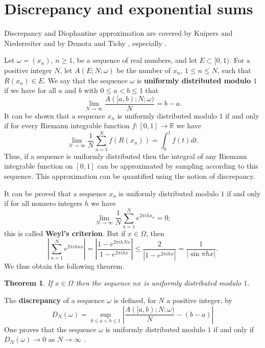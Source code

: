 \documentclass{article}
\newtheorem{theorem}{Theorem}
\begin{document}
\section{Discrepancy and exponential sums}
\label{discrepancy}
Discrepancy and Diophantine approximation are covered by Kuipers and Niederreiter \cite[Chapters 1--2 ]{kuipers} and by 
Drmota and Tichy \cite[\S\S 1.1--1.4]{drmota}, especially \cite[pp.~48--66, \S 1.4.1]{drmota}.

Let $\omega=(x_n)$, $n \geq 1$, be a sequence of real numbers, and let $E \subset [0,1)$. For a positive integer $N$, let
$A(E;N;\omega)$ be the number of $x_n$, $1 \leq n \leq N$, such that $R(x_n) \in E$. 
We say that the sequence $\omega$ is \textbf{uniformly distributed modulo $1$} if we have for all $a$ and $b$ with $0 \leq a < b \leq 1$ that 
\[
\lim_{N \to \infty} \frac{A([a,b);N;\omega)}{N}=b-a.
\]
It can be shown \cite[p. 3, Corollary 1.1]{kuipers} that a sequence $x_n$ is uniformly distributed modulo $1$ if and only if for every 
Riemann integrable function $f:[0,1] \to \mathbb{R}$ we have 
\begin{equation}
\lim_{N \to \infty} \frac{1}{N} \sum_{n=1}^N f(R(x_n))= \int_0^1 f(t) dt.
\label{riemann}
\end{equation}
Thus, if a sequence is uniformly distributed then the integral of any Riemann integrable function on $[0,1]$ can be approximated by sampling according to this sequence.
This approximation can be quantified using the notion of discrepancy.

It can be proved \cite[p.~7, Theorem 2.1]{kuipers} that a sequence $x_n$ is uniformly distributed modulo $1$ if and only if 
for all nonzero integers $h$ we have
\[
\lim_{N \to \infty} \frac{1}{N} \sum_{n=1}^N e^{2\pi ihx_n}=0;
\]
this is called \textbf{Weyl's criterion}.
But if $x \in \Omega$, then
\begin{equation}
\left| \sum_{n=1}^N e^{2\pi i hnx} \right| = \left| \frac{1-e^{2\pi i hNx}}{1-e^{2\pi ihx}} \right|
\leq \frac{2}{|1-e^{2\pi ihx}|}=\frac{1}{|\sin \pi h x|}.
\label{irratunif}
\end{equation}
We thus obtain the following theorem.

\begin{theorem}
If $x \in \Omega$ then the sequence $nx$ is uniformly distributed modulo $1$.
\label{uniformtheorem}
\end{theorem}

The \textbf{discrepancy} of a sequence $\omega$ is defined, for $N$ a positive integer, by
\[
D_N(\omega)=\sup_{0 \leq a<b \leq 1} \left| \frac{A([a,b);N;\omega)}{N}-(b-a)\right|
\]
One proves that the sequence $\omega$ is uniformly distributed modulo $1$ if and only if
$D_N(\omega) \to 0$ as $N \to \infty$ \cite[p.~89, Theorem 1.1]{kuipers}.
\end{document}
